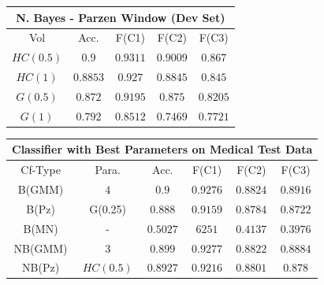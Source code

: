 \documentclass[12pt,journal,compsoc]{IEEEtran}
\begin{document}
\begin{center}
\vspace*{0.2 cm}

\begin{tabular}{|c|c|c|c|c|}
\multicolumn{5}{c}{N. Bayes - Parzen Window (Dev Set)}\\
\hline
Vol & Acc. & F(C1) & F(C2) & F(C3)\\
\hline
$HC(0.5)$ &$0.9$ &$0.9311$ &$0.9009$ &$0.867$\\
\hline
$HC(1)$ &$0.8853$ &$0.927$ &$0.8845$ &$0.845$\\
\hline
$G(0.5)$ &$0.872$ &$0.9195$ &$0.875$ &$0.8205$\\
\hline
$G(1)$ &$0.792$ &$0.8512$ &$0.7469$ &$0.7721$\\
\hline
\end{tabular}

\vspace*{0.2 cm}
\begin{table}
\centering
\begin{tabular}{|c|c|c|c|c|c|}
\multicolumn{6}{c}{Classifier with Best Parameters on Medical Test Data}\\
\hline
Cf-Type & Para. & Acc. & F(C1) & F(C2) & F(C3)\\
\hline
B(GMM) &$4$ &$0.9$ &$0.9276$ &$0.8824$ &$0.8916$\\
\hline
B(Pz) &G(0.25) &$0.888$ &$0.9159$ &$0.8784$ &$0.8722$\\
\hline
B(MN) &- &$0.5027$ &$6251$ &$0.4137$ &$0.3976$\\
\hline
NB(GMM) &$3$ &$0.899$ &$0.9277$ &$0.8822$ &$0.8884$ \\
\hline
NB(Pz) &$HC(0.5)$ &$0.8927$ &$0.9216$ &$0.8801$ &$0.878$\\
\hline
\end{tabular}
\end{table}


\end{center}
\end{document}

